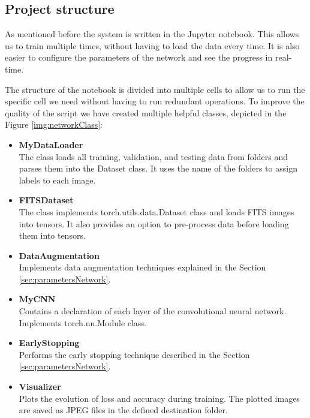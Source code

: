 \subsection{Project structure}

As mentioned before the system is written in the Jupyter notebook. This allows us to train multiple times, without having to load the data every time. It is also easier to configure the parameters of the network and see the progress in real-time. 

The structure of the notebook is divided into multiple cells to allow us to run the specific cell we need without having to run redundant operations. To improve the quality of the script we have created multiple helpful classes, depicted in the Figure \ref{img:networkClass}: 

\begin{itemize}
    \item \textbf{MyDataLoader} \\
    The class loads all training, validation, and testing data from folders and parses them into the Dataset class. It uses the name of the folders to assign labels to each image.
    
    \item \textbf{FITSDataset} \\
    The class implements torch.utils.data.Dataset class and loads FITS images into tensors. It also provides an option to pre-process data before loading them into tensors. 
    
    \item \textbf{DataAugmentation} \\
    Implements data augmentation techniques explained in the Section \ref{sec:parametersNetwork}. 
    
    \item \textbf{MyCNN} \\
    Contains a declaration of each layer of the convolutional neural network. Implements torch.nn.Module class. 
    
    \item \textbf{EarlyStopping} \\
    Performs the early stopping technique described in the Section \ref{sec:parametersNetwork}. 
    
    \item \textbf{Visualizer} \\
    Plots the evolution of loss and accuracy during training. The plotted images are saved as JPEG files in the defined destination folder. 
    

\end{itemize}
